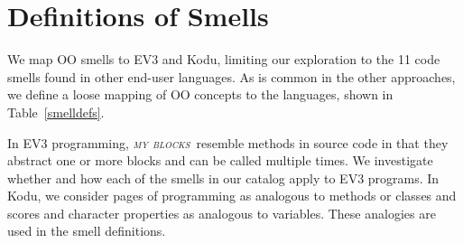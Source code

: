 \documentclass[conference]{IEEEtran}
\newcommand{\mbs}{\textsc{my blocks}}
\newcommand{\todo}[1]{\textbf{#1}}
\begin{document}



\section{Definitions of Smells}
\label{sec:definition}

We map OO smells to EV3 and Kodu, limiting our exploration to the 11 code smells found in other end-user  languages. 
As is common in the other approaches, we define a loose mapping of OO concepts to the  languages, shown in Table~\ref{smelldefs}. 

In EV3 programming, \emph{\mbs~}resemble methods in source code in that they abstract one or more  blocks and can be called multiple times. We investigate whether and how each of the smells in our catalog  apply to EV3 programs. In Kodu, we consider pages of programming as analogous to methods or classes and scores and character properties as analogous to variables. These analogies are used in the smell definitions.
\end{document}
